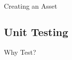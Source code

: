 \documentclass{beamer}
\begin{document}
\begin{frame}{Creating an Asset}
\end{frame}

\subsection{Unit Testing}
\begin{frame}{Why Test?}
\end{frame}
% 
% 
\end{document}
